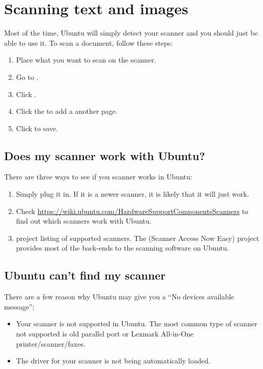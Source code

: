\section{Scanning text and images}

Most of the time, Ubuntu will simply detect your scanner and you should just be able to use it. To scan a document, follow these steps:

\begin{enumerate}
  \item Place what you want to scan on the scanner.
  \item Go to .
  \item Click .
  \item Click the  to add a another page.
  \item Click  to save.
\end{enumerate}

\subsection{Does my scanner work with Ubuntu?}
There are three ways to see if you scanner works in Ubuntu:

\begin{enumerate}
  \item Simply plug it in.  If it is a newer  scanner, it is likely that it will just work.
  \item Check \url{https://wiki.ubuntu.com/HardwareSupportComponentsScanners} to find out which scanners work with Ubuntu.
  \item {} project listing of supported scanners. The  (Scanner Access Now Easy) project provides most of the back-ends to the scanning software on Ubuntu.
\end{enumerate}

\subsection{Ubuntu can't find my scanner}
There are a few reason why Ubuntu may give you a ``No devices available message'':
\begin{itemize}
  \item Your scanner is not supported in Ubuntu. The most common type of scanner not supported is old parallel port or Lexmark All-in-One printer/scanner/faxes.
  \item The driver for your scanner is not being automatically loaded.
\end{itemize}

